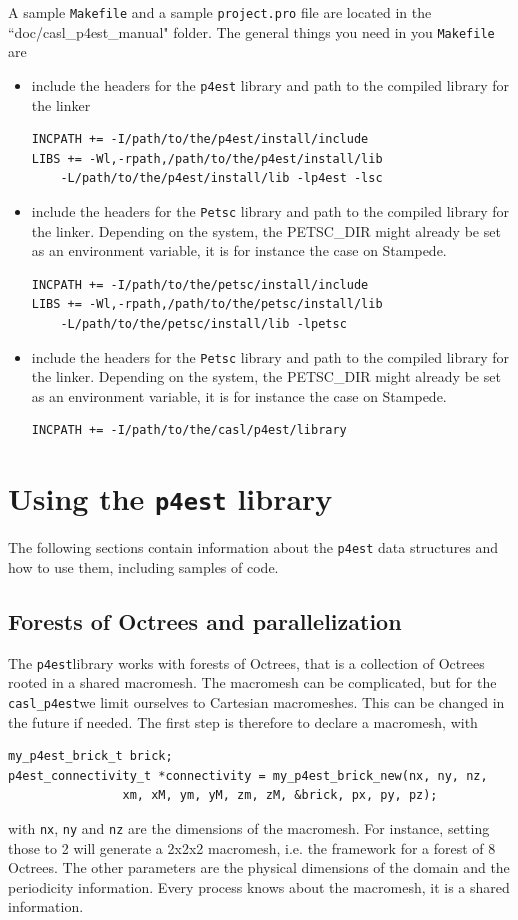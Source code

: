 \documentclass{article}
\newcommand{\pest}{\texttt{p4est}}
\newcommand{\caslpest}{\texttt{casl\_p4est}}
\newcommand{\ttt}[1]{\texttt{#1}}
\begin{document}
A sample \texttt{Makefile} and a sample \texttt{project.pro} file are located in the ``doc/casl\_p4est\_manual" folder. The general things you need in you \texttt{Makefile} are
\begin{itemize}
\item include the headers for the \texttt{p4est} library and path to the compiled library for the linker
\begin{Verbatim}[frame=single]
INCPATH += -I/path/to/the/p4est/install/include
LIBS += -Wl,-rpath,/path/to/the/p4est/install/lib
	-L/path/to/the/p4est/install/lib -lp4est -lsc
\end{Verbatim}
\item include the headers for the \texttt{Petsc} library and path to the compiled library for the linker. Depending on the system, the PETSC\_DIR might already be set as an environment variable, it is for instance the case on Stampede.
\begin{Verbatim}[frame=single]
INCPATH += -I/path/to/the/petsc/install/include
LIBS += -Wl,-rpath,/path/to/the/petsc/install/lib
	-L/path/to/the/petsc/install/lib -lpetsc
\end{Verbatim}
\item include the headers for the \texttt{Petsc} library and path to the compiled library for the linker. Depending on the system, the PETSC\_DIR might already be set as an environment variable, it is for instance the case on Stampede.
\begin{Verbatim}[frame=single]
INCPATH += -I/path/to/the/casl/p4est/library
\end{Verbatim}
\end{itemize}

\section{Using the \texttt{p4est} library}

The following sections contain information about the \texttt{p4est} data structures and how to use them, including samples of code.

\subsection{Forests of Octrees and parallelization}

The \pest library works with forests of Octrees, that is a collection of Octrees rooted in a shared macromesh. The macromesh can be complicated, but for the \caslpest we limit ourselves to Cartesian macromeshes. This can be changed in the future if needed. The first step is therefore to declare a macromesh, with
\begin{Verbatim}[frame=single]
my_p4est_brick_t brick;
p4est_connectivity_t *connectivity = my_p4est_brick_new(nx, ny, nz,
				xm, xM, ym, yM, zm, zM, &brick, px, py, pz);
\end{Verbatim}
with \ttt{nx}, \ttt{ny} and \ttt{nz} are the dimensions of the macromesh. For instance, setting those to 2 will generate a 2x2x2 macromesh, i.e. the framework for a forest of 8 Octrees. The other parameters are the physical dimensions of the domain and the periodicity information. Every process knows about the macromesh, it is a shared information.
\end{document}
